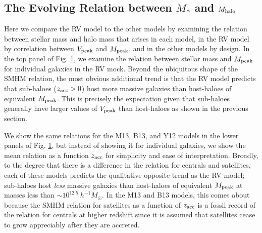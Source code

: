 \documentclass[a4paper,fleqn,usenatbib]{mnras}
\begin{document}
\begin{figure}
    \label{fig:SMHM_comparison}
\end{figure}


\subsection{The Evolving Relation between $M_*$ and $M_{\rm halo}$}
\label{sec:rv_sm_evolv}

Here we compare the RV model to the other models by examining the relation between stellar mass and halo mass that arises in each model, in the RV model by correlation between $V_{\rm peak}$ and $M_{\rm peak}$, and in the other models by design.  In the top panel of Fig. \ref{fig:SMHM_comparison}, we examine the relation between stellar mass and $M_{\rm peak}$ for individual galaxies in the RV mock.  Beyond the ubiquitous shape of the SMHM relation, the most obvious additional trend is that the RV model predicts that sub-haloes ($z_{\rm acc}>0$) host more massive galaxies than host-haloes of equivalent $M_{\rm peak}$.  This is precisely the expectation given that sub-haloes generally have larger values of $V_{\rm peak}$ than host-haloes as shown in the previous section.

We show the same relations for the M13, B13, and Y12 models in the lower panels of Fig. \ref{fig:SMHM_comparison}, but instead of showing it for individual galaxies, we show the mean relation as a function $z_{\rm acc}$ for simplicity and ease of interpretation.  Broadly, to the degree that there is a difference in the relation for centrals and satellites, each of these models predicts the qualitative opposite trend as the RV model; sub-haloes host {\em less} massive galaxies than host-haloes of equivalent $M_{\rm peak}$ at masses less than $\sim 10^{12.5} ~ h^{-1} M_{\odot}$.  In the M13 and B13 models, this comes about because the SMHM relation for satellites as a function of $z_{\rm acc}$ is a fossil record of the relation for centrals at higher redshift since it is assumed that satellites cease to grow appreciably after they are accreted.  
\end{document}
